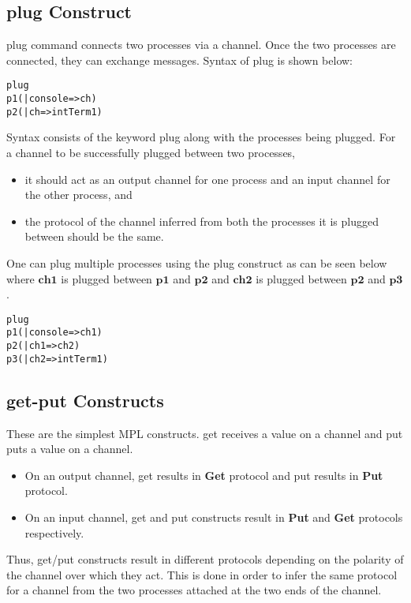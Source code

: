 \documentclass[11pt]{article}
\newcommand{\<}{\langle}
\renewcommand{\>}{\rangle}
\begin{document}
\subsection{plug Construct}
{\sf plug} command connects two processes via a channel. Once the two processes are connected, they can exchange messages. Syntax of plug is shown below:
    \begin{alltt}
              plug
                  p1 ( | console => ch)
                  p2 ( | ch => intTerm1)
    \end{alltt} 
Syntax consists of the keyword {\sf plug} along with the processes being plugged. For a channel to be successfully plugged between two processes, 
\begin{itemize}
  \item it should act as an output channel for one process and an input channel for the other process, and
  \item the protocol of the channel inferred from both the processes it is plugged between should be the same.
\end{itemize}
One can plug multiple processes using the {\sf plug} construct as can be seen below where $\mathbf{ch1}$ is plugged between $\mathbf{p1}$ and $\mathbf{p2}$ and  $\mathbf{ch2}$ is plugged between $\mathbf{p2}$ and $\mathbf{p3}$.

    \begin{alltt}
              plug
                  p1 ( | console => ch1)
                  p2 ( | ch1 => ch2)
                  p3 ( | ch2 => intTerm1)
    \end{alltt}

\subsection {get-put Constructs}
These are the simplest MPL constructs. {\sf get} receives a value on a channel and {\sf put} puts a value on a channel. 
\begin{itemize}
  \item On an output channel, {\sf get} results in {\bf Get} protocol and {\sf put} results in {\bf Put} protocol.
  \item On an input channel, {\sf get} and {\sf put} constructs result in {\bf Put} and {\bf Get} protocols respectively.
\end{itemize}
Thus, {\sf get/put} constructs result in different protocols depending on the polarity of the channel over which they act. This is done in order to infer the same protocol for a channel from the two processes attached at the two ends of the channel.
\end{document}
